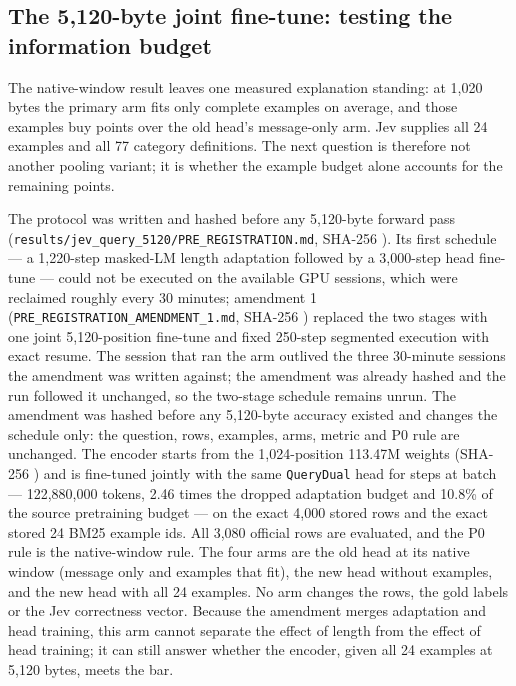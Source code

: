 

\subsection{The 5,120-byte joint fine-tune: testing the information budget}
\label{sec:jev-len5120}

The native-window result leaves one measured explanation standing: at 1{,}020
bytes the primary arm fits only \QueryEff{} complete examples on average, and
those examples buy \QueryVsOldZeroGain{} points over the old head's message-only
arm. Jev supplies all 24 examples and all 77 category definitions. The next
question is therefore not another pooling variant; it is whether the example
budget alone accounts for the remaining \QueryDiffAbs{} points.

The protocol was written and hashed before any 5{,}120-byte forward pass
(\texttt{results/jev\_query\_5120/PRE\_REGISTRATION.md}, SHA-256
\texttt{\LenPrereg}). Its first schedule --- a 1{,}220-step masked-LM length
adaptation followed by a 3{,}000-step head fine-tune --- could not be executed on
the available GPU sessions, which were reclaimed roughly every 30 minutes;
amendment 1 (\texttt{PRE\_REGISTRATION\_AMENDMENT\_1.md}, SHA-256
\texttt{\LenAmendment}) replaced the two stages with one joint 5{,}120-position
fine-tune and fixed 250-step segmented execution with exact resume. The session
that ran the arm outlived the three 30-minute sessions the amendment was written
against; the amendment was already hashed and the run followed it unchanged, so
the two-stage schedule remains unrun. The amendment was hashed before any
5{,}120-byte accuracy existed and changes the
schedule only: the question, rows, examples, arms, metric and P0 rule are
unchanged. The encoder starts from the 1{,}024-position 113.47M weights
(SHA-256 \texttt{\LenInitSha}) and is fine-tuned jointly with the same
\texttt{QueryDual} head for \LenSteps{} steps at batch \LenBatch{} ---
122{,}880{,}000 tokens, 2.46 times the dropped adaptation budget and 10.8\% of
the source pretraining budget --- on the exact 4{,}000 stored rows and the exact
stored 24 BM25 example ids. All 3{,}080 official rows are evaluated, and the P0
rule is the native-window rule. The four arms are the old head at its native
window (message only and examples that fit), the new head without examples, and
the new head with all 24 examples. No arm changes the rows, the gold labels or
the Jev correctness vector. Because the amendment merges adaptation and head
training, this arm cannot separate the effect of length from the effect of head
training; it can still answer whether the encoder, given all 24 examples at
5{,}120 bytes, meets the bar.

